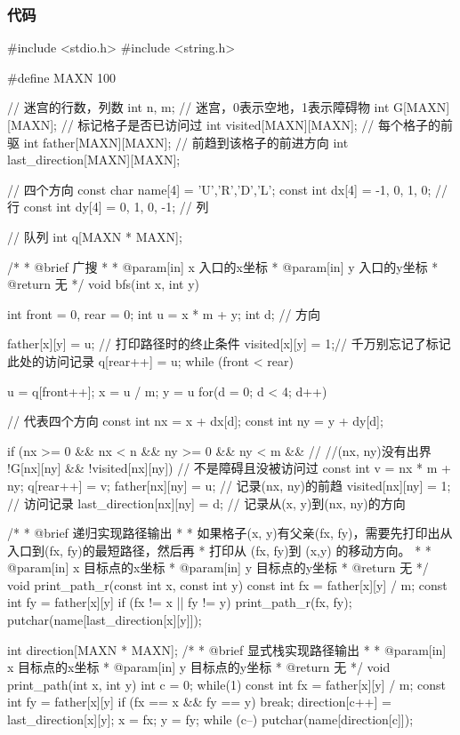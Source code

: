 \subsubsection{代码}
\begin{Codex}[label=maze.c]
#include <stdio.h>
#include <string.h>

#define MAXN 100

// 迷宫的行数，列数
int n, m;
// 迷宫，0表示空地，1表示障碍物
int G[MAXN][MAXN];
// 标记格子是否已访问过
int visited[MAXN][MAXN];
// 每个格子的前驱
int father[MAXN][MAXN];
// 前趋到该格子的前进方向
int last_direction[MAXN][MAXN];

// 四个方向
const char name[4] = {'U','R','D','L'};
const int dx[4] = {-1, 0, 1, 0}; // 行
const int dy[4] = {0, 1, 0, -1}; // 列

// 队列
int q[MAXN * MAXN];

/*
 * @brief 广搜
 *
 * @param[in] x 入口的x坐标
 * @param[in] y 入口的y坐标
 * @return 无
 */
void bfs(int x, int y) {
    int front = 0, rear = 0;
    int u = x * m + y;
    int d; // 方向
    
    father[x][y] = u; // 打印路径时的终止条件
    visited[x][y] = 1;// 千万别忘记了标记此处的访问记录
    q[rear++] = u;
    while (front < rear) {
        u = q[front++];
        x = u / m;	y = u %
        for(d = 0; d < 4; d++) { // 代表四个方向
            const int nx = x + dx[d];
            const int ny = y + dy[d];
            
            if (nx >= 0 && nx < n && ny >= 0 && ny < m &&  // //(nx, ny)没有出界
                !G[nx][ny] && !visited[nx][ny]) { // 不是障碍且没被访问过
                const int v = nx * m + ny;
                q[rear++] = v;
                father[nx][ny] = u; // 记录(nx, ny)的前趋
                visited[nx][ny] = 1; // 访问记录
                last_direction[nx][ny] = d; // 记录从(x, y)到(nx, ny)的方向
            }
        }
    }
}

/*
 * @brief 递归实现路径输出
 *
 * 如果格子(x, y)有父亲(fx, fy)，需要先打印出从入口到(fx, fy)的最短路径，然后再
 * 打印从 (fx, fy)到 (x,y) 的移动方向。
 *
 * @param[in] x 目标点的x坐标
 * @param[in] y 目标点的y坐标
 * @return 无
 */
void print_path_r(const int x, const int y) {
    const int fx = father[x][y] / m;
    const int fy = father[x][y] %
    if (fx != x || fy != y) {
        print_path_r(fx, fy);
        putchar(name[last_direction[x][y]]);
    }
}

int direction[MAXN * MAXN];
/*
 * @brief 显式栈实现路径输出
 *
 * @param[in] x 目标点的x坐标
 * @param[in] y 目标点的y坐标
 * @return 无
 */
void print_path(int x, int y) {
    int c = 0;
    while(1) {
        const int fx = father[x][y] / m;
        const int fy = father[x][y] %
        if (fx == x && fy == y) break;
        direction[c++] = last_direction[x][y];
        x = fx;
        y = fy;
    }
    while (c--) {
        putchar(name[direction[c]]);
    }
}


\end{Codex}
